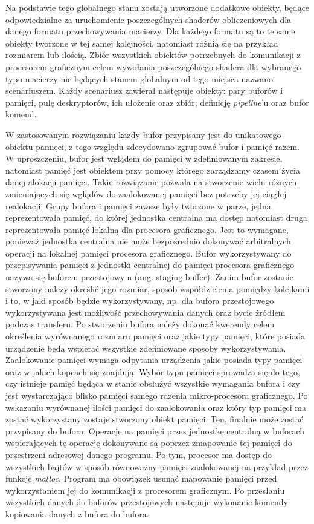Na podstawie tego globalnego stanu zostają utworzone dodatkowe obiekty, będące odpowiedzialne za uruchomienie poszczególnych shaderów obliczeniowych dla danego formatu przechowywania macierzy.
Dla każdego formatu są to te same obiekty tworzone w tej samej kolejności, natomiast różnią się na przykład rozmiarem lub ilością.
Zbiór wszystkich obiektów potrzebnych do komunikacji z procesorem graficznym celem wywołania poszczególnego shadera dla wybranego typu macierzy nie będących stanem globalnym od tego miejsca nazwano scenariuszem.
Każdy scenariusz zawierał następuje obiekty: pary buforów i pamięci, pulę deskryptorów, ich ułożenie oraz zbiór, definicję \textit{pipeline}'u oraz bufor komend.

W zastosowanym rozwiązaniu każdy bufor przypisany jest do unikatowego obiektu pamięci, z tego względu zdecydowano zgrupować bufor i pamięć razem.
W uproszczeniu, bufor jest wglądem do pamięci w zdefiniowanym zakresie, natomiast pamięć jest obiektem przy pomocy którego zarządzamy czasem życia danej alokacji pamięci.
Takie rozwiązanie pozwala na stworzenie wielu różnych zmieniających się wglądów do zaalokowanej pamięci bez potrzeby jej ciągłej realokacji.
Grupy bufora i pamięci zawsze były tworzone w parze, jedna reprezentowała pamięć, do której jednostka centralna ma dostęp natomiast druga reprezentowała pamięć lokalną dla procesora graficznego.
Jest to wymagane, ponieważ jednostka centralna nie może bezpośrednio dokonywać arbitralnych operacji na lokalnej pamięci procesora graficznego.
Bufor wykorzystywany do przepisywania pamięci z jednostki centralnej do pamięci procesora graficznego nazywa się buforem przestojowym (ang. staging buffer).
Zanim bufor zostanie stworzony należy określić jego rozmiar, sposób współdzielenia pomiędzy kolejkami i to, w jaki sposób będzie wykorzystywany, np. dla bufora przestojowego wykorzystywana jest możliwość przechowywania danych oraz bycie źródłem podczas transferu.
Po stworzeniu bufora należy dokonać kwerendy celem określenia wyrównanego rozmiaru pamięci oraz jakie typy pamięci, które posiada urządzenie będą wspierać wszystkie zdefiniowane sposoby wykorzystywania.
Zaalokowanie pamięci wymaga odpytania urządzenia jakie posiada typy pamięci oraz w jakich kopcach się znajdują.
Wybór typu pamięci sprowadza się do tego, czy istnieje pamięć będąca w stanie obsłużyć wszystkie wymagania bufora i czy jest wystarczająco blisko pamięci samego rdzenia mikro-procesora graficznego.
Po wskazaniu wyrównanej ilości pamięci do zaalokowania oraz który typ pamięci ma zostać wykorzystany zostaje stworzony obiekt pamięci.
Ten, finalnie może zostać przypisany do bufora.
Operacje na pamięci przez jednostkę centralną w buforach wspierających tę operację dokonywane są poprzez zmapowanie tej pamięci do przestrzeni adresowej danego programu.
Po tym, procesor ma dostęp do wszystkich bajtów w sposób równoważny pamięci zaalokowanej na przykład przez funkcję \textit{malloc}.
Program ma obowiązek usunąć mapowanie pamięci przed wykorzystaniem jej do komunikacji z procesorem graficznym.
Po przesłaniu wszystkich danych do buforów przestojowych następuje wykonanie komendy kopiowania danych z bufora do bufora.

